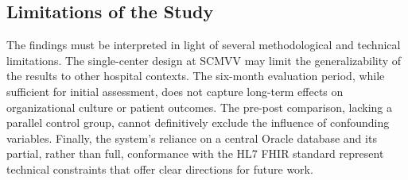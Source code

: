 \subsection{Limitations of the Study}
The findings must be interpreted in light of several methodological and technical limitations. The single-center design at SCMVV may limit the generalizability of the results to other hospital contexts. The six-month evaluation period, while sufficient for initial assessment, does not capture long-term effects on organizational culture or patient outcomes. The pre-post comparison, lacking a parallel control group, cannot definitively exclude the influence of confounding variables. Finally, the system's reliance on a central Oracle database and its partial, rather than full, conformance with the HL7 FHIR standard represent technical constraints that offer clear directions for future work.